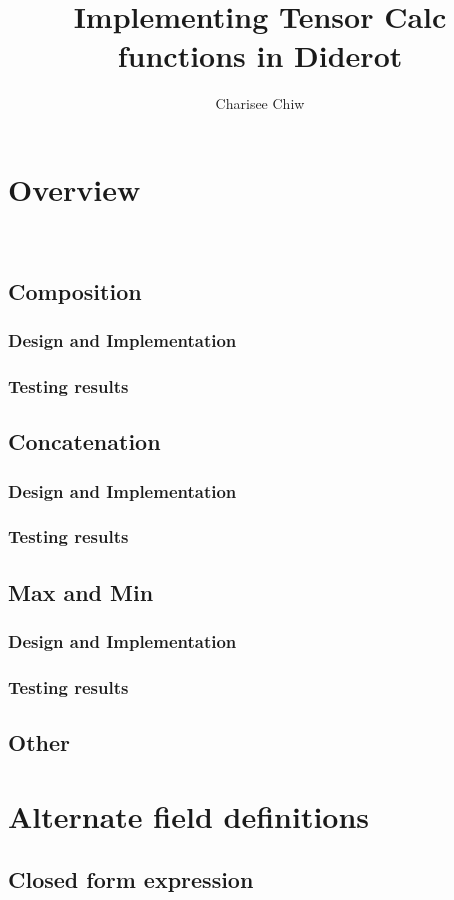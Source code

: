 \documentclass{article}
\title{Implementing Tensor Calc functions in Diderot}
\author{Charisee Chiw}
\begin{document}
\maketitle 
\section{Overview}
\\

\subsection{{\color{blue} Composition}}
\subsubsection{Design and Implementation}

\subsubsection{Testing results}



\subsection{{\color{blue} Concatenation}}
\subsubsection{Design and Implementation}

\subsubsection{Testing results}



\subsection{{\color{blue} Max and Min}} 
\subsubsection{Design and Implementation}

\subsubsection{Testing results}



\subsection{{\color{blue} Other}}




\section{Alternate field definitions}
\subsection{{\color{blue}Closed form expression}}




 
\end{document}
